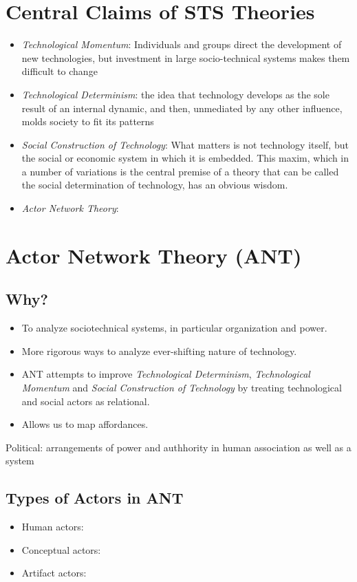 \documentclass[a4paper]{article}
\numberwithin{equation}{section}
\begin{document}
\section{Central Claims of STS Theories}
\begin{itemize}
    \item \textit{Technological Momentum}: Individuals and groups direct the development of new technologies, but investment in large socio-technical systems makes them difficult to change
    \item \textit{Technological Determinism}: the idea that technology develops as the sole result of an internal dynamic, and then, unmediated by any other influence, molds society to fit its patterns
    \item \textit{Social Construction of Technology}: What matters is not technology itself, but the social or economic system in which it is embedded. This maxim, which in a number of variations is the central premise of a theory that can be called the social determination of technology, has an obvious wisdom.
    \item \textit{Actor Network Theory}: 
\end{itemize}
\section{Actor Network Theory (ANT)}
\subsection{Why?}
\begin{itemize}
    \item To analyze sociotechnical systems, in particular organization and power.
    \item More rigorous ways to analyze ever-shifting nature of technology.
    \item ANT attempts to improve \textit{Technological Determinism}, \textit{Technological Momentum} and \textit{Social Construction of Technology} by treating technological and social actors as relational.
    \item Allows us to map affordances.
\end{itemize}

Political: arrangements of power and authhority in human association as well as a system

\subsection{Types of Actors in ANT}
\begin{itemize}
    \item Human actors:
    \item Conceptual actors:
    \item Artifact actors:
\end{itemize}
\end{document}
